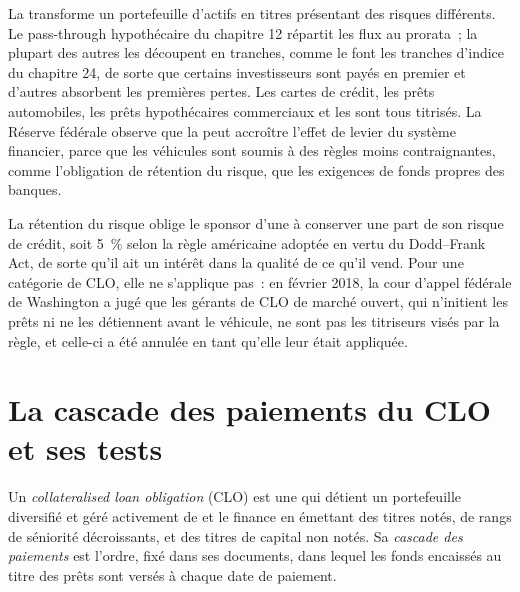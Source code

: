 La  transforme un portefeuille d'actifs en titres présentant des risques différents. Le
pass-through hypothécaire du chapitre 12 répartit les flux au prorata~; la plupart des autres
 les découpent en tranches, comme le font les tranches d'indice du chapitre 24, de sorte que certains
investisseurs sont payés en premier et d'autres absorbent les premières pertes. Les cartes de crédit, les prêts automobiles,
les prêts hypothécaires commerciaux et les  sont tous titrisés. La Réserve fédérale
observe que la  peut accroître l'effet de levier du système financier, parce que les
véhicules sont soumis à des règles moins contraignantes, comme l'obligation de rétention du risque, que les
exigences de fonds propres des banques.

La rétention du risque oblige le sponsor d'une  à conserver une part de son risque de
crédit, soit 5~\% selon la règle américaine adoptée en vertu du Dodd--Frank Act, de sorte qu'il ait
un intérêt dans la qualité de ce qu'il vend. Pour une catégorie de CLO, elle ne s'applique pas~: en février 2018, la
cour d'appel fédérale de Washington a jugé que les gérants de CLO de marché ouvert, qui
n'initient les prêts ni ne les détiennent avant le véhicule, ne sont pas les
titriseurs visés par la règle, et celle-ci a été annulée en tant qu'elle leur était appliquée.

\section{La cascade des paiements du CLO et ses tests}

\begin{definition}\label{def:m2:loans-clos-and-securitisation:clo}
Un \emph{collateralised loan obligation} (CLO)
est une  qui détient un portefeuille diversifié et géré activement de 
et le finance en émettant des titres notés, de rangs de séniorité décroissants, et des titres de capital non notés. Sa
\emph{cascade des paiements} est l'ordre, fixé dans ses documents,
dans lequel les fonds encaissés au titre des prêts sont versés à chaque date de paiement.
\end{definition}

